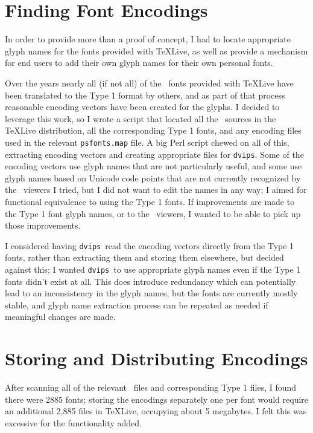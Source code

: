 \documentclass{ltugboat}
\def\PDF{\acro{PDF}}
\def\dvips{\texttt{dvips}}
\begin{document}
\section{Finding Font Encodings}

In order to provide more than a proof of concept, I had to
locate appropriate glyph names for the fonts provided with
\TeX Live, as well as provide a mechanism for end users to add their
own glyph names for their own personal fonts.

Over the years nearly all (if not all) of the \MF\ fonts
provided with \TeX Live have been translated to the Type 1
format by others, and as part of that process reasonable
encoding vectors have been created for the glyphs.  I
decided to leverage this work, so I wrote a
script that located all the \MF\ sources in the \TeX Live
distribution, all the corresponding Type 1 fonts, and any
encoding files used in the relevant \texttt{psfonts.map}
file.  A big Perl script chewed on all of this, extracting
encoding vectors and creating appropriate files for
\dvips.  Some of
the encoding vectors use glyph names that are not particularly
useful, and some use glyph names based on Unicode code
points that are not currently recognized by the \PDF\ viewers
I tried, but I did not want to edit the names in any way;
I aimed for functional equivalence to using the Type 1
fonts.  If improvements are made to the Type 1 font glyph
names, or to the \PDF\ viewers, I wanted to be able to pick
up those improvements.

I considered having \dvips\ read the encoding vectors
directly from the Type 1 fonts, rather than extracting them
and storing them elsewhere, but decided against this; I wanted
\dvips\ to use appropriate glyph names even if the Type 1
fonts didn't exist at all.  This does introduce
redundancy which can potentially lead to an inconsistency in
the glyph names, but the fonts are currently mostly stable, and
glyph name extraction process can be
repeated as needed if meaningful changes are made.

\section{Storing and Distributing Encodings}

After scanning all of the relevant \MF\ files and corresponding
Type 1 files, I found there were 2885 fonts; storing the
encodings separately one per font would require an additional
2,885 files in \TeX Live, occupying about 5 megabytes.  I felt
this was excessive for the functionality added.
\end{document}
